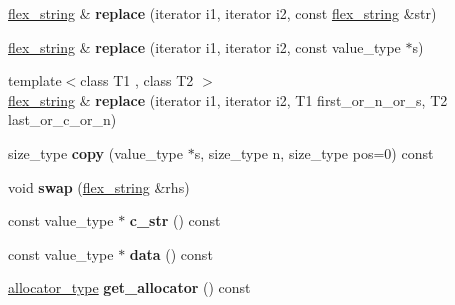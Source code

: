 \begin{DoxyCompactItemize}
\item 
\hypertarget{classflex__string_a37a69f797e6994cb34f614657d0198bc}{}\hyperlink{classflex__string}{flex\+\_\+string} \& {\bfseries replace} (iterator i1, iterator i2, const \hyperlink{classflex__string}{flex\+\_\+string} \&str)\label{classflex__string_a37a69f797e6994cb34f614657d0198bc}

\item 
\hypertarget{classflex__string_aea9140a6e584ea29688a7a2bf5e22423}{}\hyperlink{classflex__string}{flex\+\_\+string} \& {\bfseries replace} (iterator i1, iterator i2, const value\+\_\+type $\ast$s)\label{classflex__string_aea9140a6e584ea29688a7a2bf5e22423}

\item 
\hypertarget{classflex__string_ac073f6e89b362c2140076cfa2c833618}{}{\footnotesize template$<$class T1 , class T2 $>$ }\\\hyperlink{classflex__string}{flex\+\_\+string} \& {\bfseries replace} (iterator i1, iterator i2, T1 first\+\_\+or\+\_\+n\+\_\+or\+\_\+s, T2 last\+\_\+or\+\_\+c\+\_\+or\+\_\+n)\label{classflex__string_ac073f6e89b362c2140076cfa2c833618}

\item 
\hypertarget{classflex__string_a90244c0a4dadc5ad7c93957043f57a86}{}size\+\_\+type {\bfseries copy} (value\+\_\+type $\ast$s, size\+\_\+type n, size\+\_\+type pos=0) const \label{classflex__string_a90244c0a4dadc5ad7c93957043f57a86}

\item 
\hypertarget{classflex__string_a985cf302541ae071e4116ae21f71c27f}{}void {\bfseries swap} (\hyperlink{classflex__string}{flex\+\_\+string} \&rhs)\label{classflex__string_a985cf302541ae071e4116ae21f71c27f}

\item 
\hypertarget{classflex__string_a9e6826eb690a19ec8ab7abd792f64d6d}{}const value\+\_\+type $\ast$ {\bfseries c\+\_\+str} () const \label{classflex__string_a9e6826eb690a19ec8ab7abd792f64d6d}

\item 
\hypertarget{classflex__string_a1628c666bd06d404db681d9cbb654773}{}const value\+\_\+type $\ast$ {\bfseries data} () const \label{classflex__string_a1628c666bd06d404db681d9cbb654773}

\item 
\hypertarget{classflex__string_a9d9d8b9e3d8dacf0a5e911b13e47c2b4}{}\hyperlink{structA}{allocator\+\_\+type} {\bfseries get\+\_\+allocator} () const \label{classflex__string_a9d9d8b9e3d8dacf0a5e911b13e47c2b4}


\end{DoxyCompactItemize}
